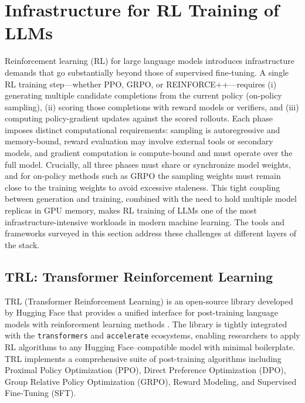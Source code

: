 \section{Infrastructure for RL Training of LLMs}
\label{sec:infrastructure-rl-training}

Reinforcement learning (RL) for large language models introduces infrastructure demands that go substantially beyond those of supervised fine-tuning. A single RL training step---whether PPO, GRPO, or REINFORCE++---requires (i) generating multiple candidate completions from the current policy (on-policy sampling), (ii) scoring those completions with reward models or verifiers, and (iii) computing policy-gradient updates against the scored rollouts. Each phase imposes distinct computational requirements: sampling is autoregressive and memory-bound, reward evaluation may involve external tools or secondary models, and gradient computation is compute-bound and must operate over the full model. Crucially, all three phases must share or synchronize model weights, and for on-policy methods such as GRPO the sampling weights must remain close to the training weights to avoid excessive staleness. This tight coupling between generation and training, combined with the need to hold multiple model replicas in GPU memory, makes RL training of LLMs one of the most infrastructure-intensive workloads in modern machine learning. The tools and frameworks surveyed in this section address these challenges at different layers of the stack.

\subsection{TRL: Transformer Reinforcement Learning}

TRL (Transformer Reinforcement Learning) is an open-source library developed by Hugging Face that provides a unified interface for post-training language models with reinforcement learning methods \cite{vonwerra2022trl}. The library is tightly integrated with the \texttt{transformers} and \texttt{accelerate} ecosystems, enabling researchers to apply RL algorithms to any Hugging Face--compatible model with minimal boilerplate. TRL implements a comprehensive suite of post-training algorithms including Proximal Policy Optimization (PPO), Direct Preference Optimization (DPO), Group Relative Policy Optimization (GRPO), Reward Modeling, and Supervised Fine-Tuning (SFT).

